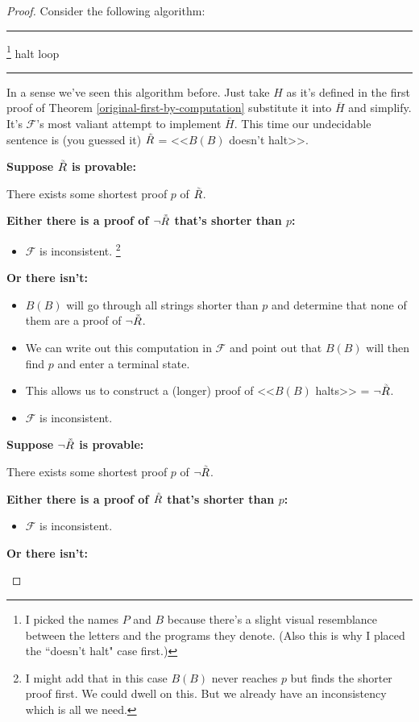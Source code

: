 \documentclass{article}
\newcommand{\nameditem}[1]{\item\textbf{#1}}
\newcommand{\impl}{\item[$\Rightarrow$]}
\newcommand{\F}{\ensuremath{\mathcal{F}}}
\newcommand{\iRosser}{\ensuremath{\accentset{\scalebox{0.35}{$\infty$}}{R}}}
\newenvironment{algo}{\begin{samepage}\medskip\hrule\begin{algorithmic}[H]}{\end{algorithmic}\hrule\medskip\end{samepage}}
\begin{document}
\begin{proof}
Consider the following algorithm:
\begin{algo}
\footnote{I picked the names $P$ and $B$ because there's a slight visual resemblance between the letters and the programs they denote. (Also this is why I placed the ``doesn't halt" case first.)}
      \State halt
    \EndIf
      \State loop
    \EndIf
  \EndFor
\EndFunction
\end{algo}
In a sense we've seen this algorithm before. Just take $H$ as it's defined in the first proof of Theorem \ref{original-first-by-computation} substitute it into $\overline{H}$ and simplify. It's $\F$'s most valiant attempt to implement $\overline{H}$. This time our undecidable sentence is (you guessed it) $\iRosser$ = <<$B(B)$ doesn't halt>>.
\begin{description}
\nameditem{Suppose $\iRosser$ is provable:}
\begin{description}
\impl There exists some shortest proof $p$ of $\iRosser$.
\nameditem{Either there is a proof of $\neg \iRosser$ that's shorter than $p$:}
\begin{itemize}
\impl $\F$ is inconsistent. \lightning\footnote{I might add that in this case $B(B)$ never reaches $p$ but finds the shorter proof first. We could dwell on this. But we already have an inconsistency which is all we need.}
\end{itemize}
\nameditem{Or there isn't:}
\begin{itemize}
\impl $B(B)$ will go through all strings shorter than $p$ and determine that none of them are a proof of $\neg \iRosser$.
\impl We can write out this computation in $\F$ and point out that $B(B)$ will then find $p$ and enter a terminal state.
\impl This allows us to construct a (longer) proof of <<$B(B)$ halts>> = $\neg \iRosser$.
\impl $\F$ is inconsistent. \lightning
\end{itemize}
\end{description}
\nameditem{Suppose $\neg \iRosser$ is provable:}
\begin{description}
\impl There exists some shortest proof $p$ of $\neg \iRosser$.
\nameditem{Either there is a proof of $\iRosser$ that's shorter than $p$:}
\begin{itemize}
\impl $\F$ is inconsistent. \lightning
\end{itemize}
\nameditem{Or there isn't:}
\begin{itemize}

\end{itemize}
\end{description}
\end{description}
\end{proof}
\end{document}
